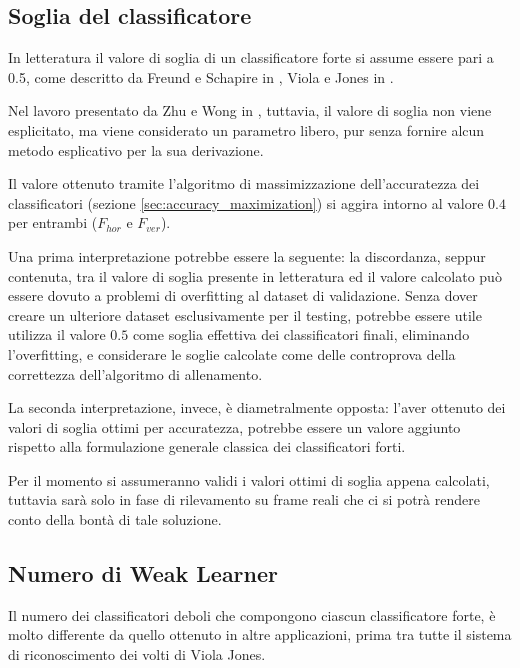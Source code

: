             \subsection{Soglia del classificatore} %
            \label{sub:soglia_del_classificatore}            
                In letteratura il valore di soglia di un classificatore forte si assume essere pari a 0.5, come descritto da Freund e Schapire in \cite{Freund97}, Viola e Jones in \cite{Viola04}.

                Nel lavoro presentato da Zhu e Wong in \cite{Zhu13}, tuttavia, il valore di soglia non viene esplicitato, ma viene considerato un parametro libero, pur senza fornire alcun metodo esplicativo per la sua derivazione.

                Il valore ottenuto tramite l'algoritmo di massimizzazione dell'accuratezza dei classificatori (sezione \ref{sec:accuracy_maximization}) si aggira intorno al valore $0.4$ per entrambi ($F_{hor}$ e $F_{ver}$).
                
                Una prima interpretazione potrebbe essere la seguente: la discordanza, seppur contenuta, tra il valore di soglia presente in letteratura ed il valore calcolato può essere dovuto a problemi di overfitting al dataset di validazione.
                Senza dover creare un ulteriore dataset esclusivamente per il testing, potrebbe essere utile utilizza il valore $0.5$ come soglia effettiva dei classificatori finali, eliminando l'overfitting, e considerare le soglie calcolate come delle controprova della correttezza dell'algoritmo di allenamento.

                La seconda interpretazione, invece, è diametralmente opposta: l'aver ottenuto dei valori di soglia ottimi per accuratezza, potrebbe essere un valore aggiunto rispetto alla formulazione generale classica dei classificatori forti.

                Per il momento si assumeranno validi i valori ottimi di soglia appena calcolati, tuttavia sarà solo in fase di rilevamento su frame reali che ci si potrà rendere conto della bontà di tale soluzione.

            \subsection{Numero di Weak Learner} %
            \label{sub:numero_di_weak_learner}
                Il numero dei classificatori deboli che compongono ciascun classificatore forte, è molto differente da quello ottenuto in altre applicazioni, prima tra tutte il sistema di riconoscimento dei volti di Viola Jones.

